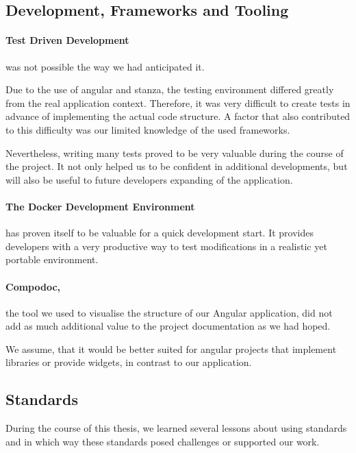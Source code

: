 \subsection{Development, Frameworks and Tooling}

\paragraph{Test Driven Development} was not possible the way we had anticipated it.

Due to the use of angular and stanza, the testing environment differed greatly from the real application context.
Therefore, it was very difficult to create tests in advance of implementing the actual code structure.
A factor that also contributed to this difficulty was our limited knowledge of the used frameworks.

Nevertheless, writing many tests proved to be very valuable during the course of the project.
It not only helped us to be confident in additional developments,
but will also be useful to future developers expanding of the application.

\paragraph{The Docker Development Environment} has proven itself to be valuable for a quick development start.
It provides developers with a very productive way to test modifications in a realistic yet portable environment.

\paragraph{Compodoc,} the tool we used to visualise the structure of our Angular application,
did not add as much additional value to the project documentation as we had hoped.

We assume, that it would be better suited for angular projects that implement libraries or provide widgets, in contrast to our application.

\subsection{Standards}\label{lessons-learned-standards}

During the course of this thesis, we learned several lessons about using standards and in which way these standards posed challenges or supported our work.

